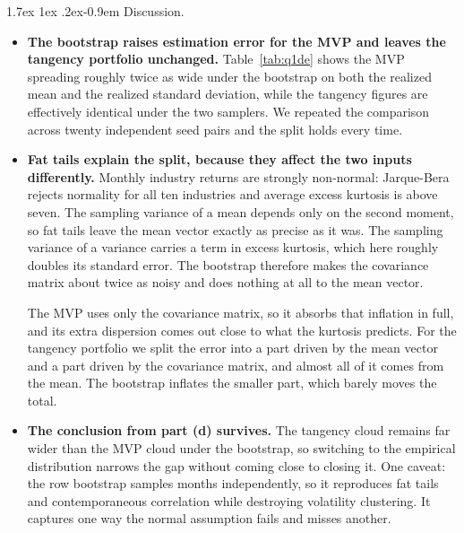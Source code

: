 \documentclass[11pt]{article}
\makeatletter
\renewcommand\section{\@startsection{section}{1}{0pt}%
  {-2.6ex \@plus -1ex \@minus -.2ex}{1.3ex \@plus .2ex}%
  {\normalfont\scshape\large\color{psink}}}   %
\renewcommand\paragraph{\@startsection{paragraph}{4}{0pt}%
  {1.7ex \@plus 1ex \@minus .2ex}{-0.9em}%
  {\normalfont\bfseries\normalsize\color{psink}}}
\makeatother
\begin{document}
\paragraph{Discussion.}
\begin{itemize}
\setlength{\itemsep}{4pt}\setlength{\parskip}{0pt}

\item \textbf{The bootstrap raises estimation error for the MVP and leaves the
tangency portfolio unchanged.} Table~\ref{tab:q1de} shows the MVP spreading
roughly twice as wide under the bootstrap on both the realized mean and the
realized standard deviation, while the tangency figures are effectively
identical under the two samplers. We repeated the comparison across twenty
independent seed pairs and the split holds every time.

\item \textbf{Fat tails explain the split, because they affect the two inputs
differently.} Monthly industry returns are strongly non-normal: Jarque-Bera
rejects normality for all ten industries and average excess kurtosis is above
seven. The sampling variance of a mean depends only on the second moment, so
fat tails leave the mean vector exactly as precise as it was. The sampling
variance of a variance carries a term in excess kurtosis, which here roughly
doubles its standard error. The bootstrap therefore makes the covariance
matrix about twice as noisy and does nothing at all to the mean vector.

The MVP uses only the covariance matrix, so it absorbs that inflation in full,
and its extra dispersion comes out close to what the kurtosis predicts. For
the tangency portfolio we split the error into a part driven by the mean
vector and a part driven by the covariance matrix, and almost all of it comes
from the mean. The bootstrap inflates the smaller part, which barely moves the
total.

\item \textbf{The conclusion from part (d) survives.} The tangency cloud
remains far wider than the MVP cloud under the bootstrap, so switching to the
empirical distribution narrows the gap without coming close to closing it. One
caveat: the row bootstrap samples months independently, so it reproduces fat
tails and contemporaneous correlation while destroying volatility clustering.
It captures one way the normal assumption fails and misses another.

\end{itemize}

\end{document}
